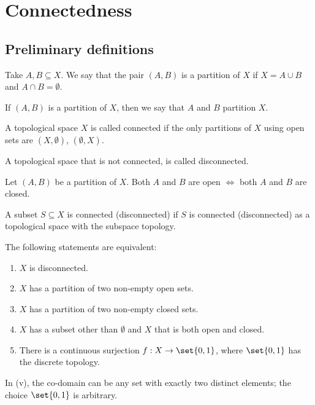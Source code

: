 \section{Connectedness}
\subsection{Preliminary definitions}
\begin{ndfn}[Partition]
  Take $A, B \subseteq X$. We say that the pair $(A,B)$ is a partition of $X$ if $X = A \cup B$ and $A \cap B = \emptyset$.
\end{ndfn}
If $(A,B)$ is a partition of $X$, then we say that $A$ and $B$ partition $X$.

\begin{ndfn}[Connected]
  A topological space $X$ is called connected if the only partitions of $X$ using open sets are $(X, \emptyset)$, $(\emptyset, X)$.
\end{ndfn}
A topological space that is not connected, is called disconnected.

\begin{remark}
  Let $(A,B)$ be a partition of $X$. Both $A$ and $B$ are open $\iff$ both $A$ and $B$ are closed.
\end{remark}

\begin{ndfn}
  A subset $S \subseteq X$ is connected (disconnected) if $S$ is connected (disconnected) as a topological space with the subspace topology.
\end{ndfn}

\begin{nthm}\label{thm:disconnected-equiv}
  The following statements are equivalent:
  \begin{enumerate}
  \item $X$ is disconnected.
  \item $X$ has a partition of two non-empty open sets.
  \item $X$ has a partition of two non-empty closed sets.
  \item $X$ has a subset other than $\emptyset$ and $X$ that is both open and closed.
  \item There is a continuous surjection $f: X \to \set{0,1}$, where $\set{0,1}$ has the discrete topology.
  \end{enumerate}
\end{nthm}

In (v), the co-domain can be any set with exactly two distinct elements; the choice $\set{0,1}$ is arbitrary.

